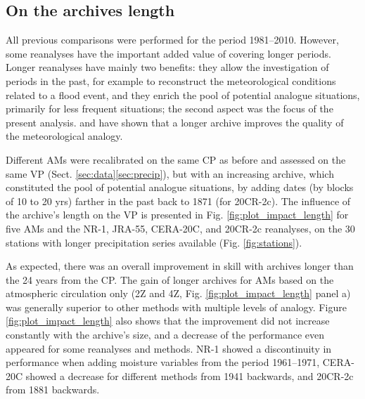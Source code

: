 \documentclass{ametsoc}
\begin{document}
	
	\subsection{On the archives length}
	\label{sec:length}
	
	All previous comparisons were performed for the period 1981--2010. However, some reanalyses have the important added value of covering longer periods. Longer reanalyses have mainly two benefits: they allow the investigation of periods in the past, for example to reconstruct the meteorological conditions related to a flood event, and they enrich the pool of potential analogue situations, primarily for less frequent situations; the second aspect was the focus of the present analysis. \citet{Ruosteenoja1988} and \citet{Vandendool1994} have shown that a longer archive improves the quality of the meteorological analogy.
	
	Different AMs were recalibrated on the same CP as before and assessed on the same VP (Sect. \ref{sec:data}\ref{sec:precip}), but with an increasing archive, which constituted the pool of potential analogue situations, by adding dates (by blocks of 10 to 20 yrs) farther in the past back to 1871 (for 20CR-2c). The influence of the archive's length on the VP is presented in Fig. \ref{fig:plot_impact_length} for five AMs and the NR-1, JRA-55, CERA-20C, and 20CR-2c reanalyses, on the 30 stations with longer precipitation series available (Fig. \ref{fig:stations}). 
	
	As expected, there was an overall improvement in skill with archives longer than the 24 years from the CP. The gain of longer archives for AMs based on the atmospheric circulation only (2Z and 4Z, Fig. \ref{fig:plot_impact_length} panel a) was generally superior to other methods with multiple levels of analogy. Figure \ref{fig:plot_impact_length} also shows that the improvement did not increase constantly with the archive's size, and a decrease of the performance even appeared for some reanalyses and methods. NR-1 showed a discontinuity in performance when adding moisture variables from the period 1961--1971, CERA-20C showed a decrease for different methods from 1941 backwards, and 20CR-2c from 1881 backwards.
	
\end{document}
